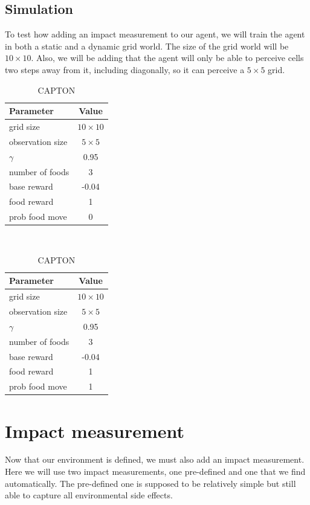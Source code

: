 \documentclass[12pt,A4]{report}
\theoremstyle{definition}
\begin{document}
\subsection{Simulation}
To test how adding an impact measurement to our agent, we will train the agent in both a static and a dynamic grid world. The size of the grid world will be $10\times10$. Also, we will be adding that the agent will only be able to perceive cells two steps away from it, including diagonally, so it can perceive a $5\times5$ grid.

\begin{table}
  \centering
  \begin{tabular}{l | c}
    Parameter& Value \\ \hline
    grid size & $10 \times  10$ \\
    observation size & $5 \times  5$ \\
    $\gamma$ & 0.95 \\
    number of foods & 3 \\
    base reward & -0.04 \\
    food reward & 1 \\
    prob food move & 0 \\
  \end{tabular}
  \
  \begin{tabular}{l | c}
    Parameter& Value \\ \hline
    grid size & $10 \times  10$ \\
    observation size & $5 \times  5$ \\
    $\gamma$ & 0.95 \\
    number of foods & 3 \\
    base reward & -0.04 \\
    food reward & 1 \\
    prob food move & 1 \\
  \end{tabular}
  \caption{CAPTON}
  \label{tab:sim_parms}
\end{table}

\section{Impact measurement}
Now that our environment is defined, we must also add an impact measurement. Here we will use two impact measurements, one pre-defined and one that we find automatically. The pre-defined one is supposed to be relatively simple but still able to capture all environmental side effects. 
\end{document}
